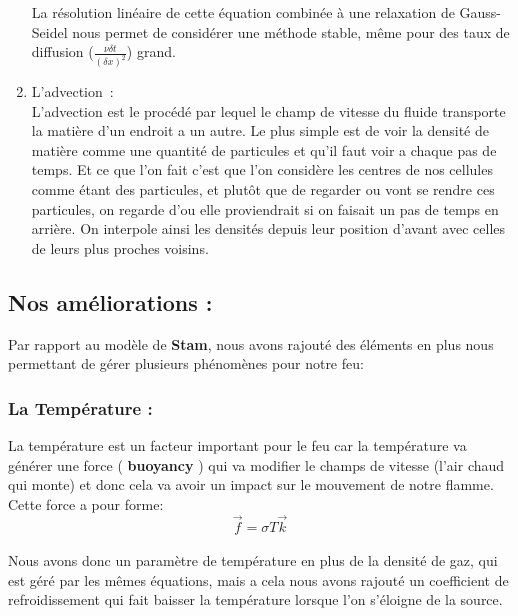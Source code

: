 \documentclass[a4paper,10pt]{article}
\begin{document}
\begin{enumerate}
  La résolution linéaire de cette équation combinée à une relaxation de
  Gauss-Seidel nous permet de considérer une méthode stable, même pour
  des taux de diffusion ($ \frac{\nu \delta t}{({\delta x})^2}$)
  grand.\\
  
  \item{L'advection~:}\\ L'advection est le procédé par lequel le
    champ de vitesse du fluide transporte la matière d'un endroit a un
    autre. Le plus simple est de voir la densité de matière comme une
    quantité de particules et qu'il faut voir a chaque pas de
    temps. Et ce que l'on fait c'est que l'on considère les centres de
    nos cellules comme étant des particules, et plutôt que de regarder
    ou vont se rendre ces particules, on regarde d'ou elle
    proviendrait si on faisait un pas de temps en arrière. On
    interpole ainsi les densités depuis leur position d'avant avec
    celles de leurs plus proches voisins.\\
\end{enumerate}

\subsection{Nos améliorations :}
Par rapport au modèle de \textbf{Stam}, nous avons rajouté des éléments en plus 
nous permettant de gérer plusieurs phénomènes pour notre feu:\\
 
\subsubsection{La Température :}
La température est un facteur important pour le feu car la température
va générer une force ( \textbf{buoyancy} ) qui va modifier le champs de vitesse 
(l'air chaud qui monte) et donc cela va avoir un impact sur le mouvement de notre
flamme.\\ 
Cette force a pour forme:\\
\begin{equation}
	\vec{f} = \sigma T \vec{k} 
\end{equation}
\\

Nous avons donc un paramètre de température en plus de la densité de gaz, qui
est géré par les mêmes équations, mais a cela nous avons rajouté un
coefficient de refroidissement qui fait baisser la température lorsque
l'on s'éloigne de la source.\\
\end{document}
